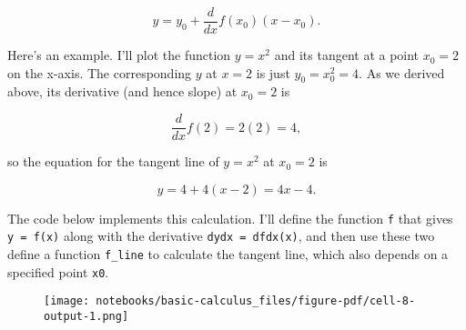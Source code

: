 \documentclass[
  letterpaper,
  DIV=11,
  numbers=noendperiod]{scrreprt}
\newenvironment{Shaded}{\begin{snugshade}}{\end{snugshade}}
\newcommand{\DecValTok}[1]{\textcolor[rgb]{0.68,0.00,0.00}{#1}}
\newcommand{\FloatTok}[1]{\textcolor[rgb]{0.68,0.00,0.00}{#1}}
\newcommand{\KeywordTok}[1]{\textcolor[rgb]{0.00,0.23,0.31}{#1}}
\newcommand{\NormalTok}[1]{\textcolor[rgb]{0.00,0.23,0.31}{#1}}
\newcommand{\OperatorTok}[1]{\textcolor[rgb]{0.37,0.37,0.37}{#1}}
\newcommand{\SpecialCharTok}[1]{\textcolor[rgb]{0.37,0.37,0.37}{#1}}
\newcommand{\SpecialStringTok}[1]{\textcolor[rgb]{0.13,0.47,0.30}{#1}}
\begin{document}
\[y = y_0 + \frac{d}{dx}f(x_0)(x - x_0).\]

Here's an example. I'll plot the function \(y=x^2\) and its tangent at a
point \(x_0=2\) on the x-axis. The corresponding \(y\) at \(x=2\) is
just \(y_0=x_0^2=4\). As we derived above, its derivative (and hence
slope) at \(x_0=2\) is

\[\frac{d}{dx}f(2)=2(2)=4,\]

so the equation for the tangent line of \(y=x^2\) at \(x_0=2\) is

\[y = 4 + 4(x - 2) = 4x -4.\]

The code below implements this calculation. I'll define the function
\texttt{f} that gives \texttt{y\ =\ f(x)} along with the derivative
\texttt{dydx\ =\ dfdx(x)}, and then use these two define a function
\texttt{f\_line} to calculate the tangent line, which also depends on a
specified point \texttt{x0}.

\begin{Shaded}
\end{Shaded}

\begin{figure}[H]

{\centering \texttt{[image: notebooks/basic-calculus\_files/figure-pdf/cell-8-output-1.png]}

}

\end{figure}
\end{document}
